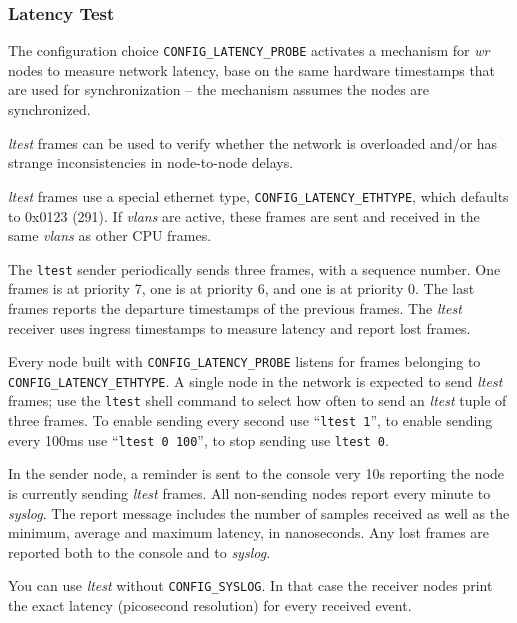 \documentclass[a4paper, 12pt]{article}
\begin{document}

\subsubsection{Latency Test}
\label{Latency Test}

\begin{sloppypar} %
The configuration choice \texttt{CONFIG\_LATENCY\_PROBE} activates a
mechanism for \textit{wr} nodes to measure network latency, base on the same
hardware timestamps that are used for synchronization -- the mechanism
assumes the nodes are synchronized.

\textit{ltest} frames can be used to verify whether the network is
overloaded and/or has strange inconsistencies in node-to-node delays.

\textit{ltest} frames use a special ethernet type, \texttt{CONFIG\_LATENCY\_ETHTYPE},
which defaults to 0x0123 (291). If \textit{vlans} are active, these frames
are sent and received in the same \textit{vlans} as other CPU frames.

The \texttt{ltest} sender periodically sends three frames, with a sequence
number. One frames is at priority 7, one is at priority 6, and one is
at priority 0. The last frames reports the departure timestamps of the
previous frames.  The \textit{ltest} receiver uses ingress timestamps to
measure latency and report lost frames.

Every node built with \texttt{CONFIG\_LATENCY\_PROBE} listens for frames
belonging to \texttt{CONFIG\_LATENCY\_ETHTYPE}.  A single node in the
network is expected to send \textit{ltest} frames; use the \texttt{ltest}
shell command to select how often to send an \textit{ltest} tuple of three
frames. To enable sending every second use ``\texttt{ltest 1}'', to enable
sending every 100ms use ``\texttt{ltest 0 100}'', to stop sending use
\texttt{ltest 0}.

In the sender node, a reminder is sent to the console very 10s
reporting the node is currently sending \textit{ltest} frames.  All
non-sending nodes report every minute to \textit{syslog}. The
report message includes the number of samples received as well
as the minimum, average and maximum latency, in nanoseconds.
Any lost frames are reported both to the console and to \textit{syslog}.

You can use \textit{ltest} without \texttt{CONFIG\_SYSLOG}. In that case the
receiver nodes print the exact latency (picosecond resolution) for
every received event.
\end{sloppypar}
\end{document}

